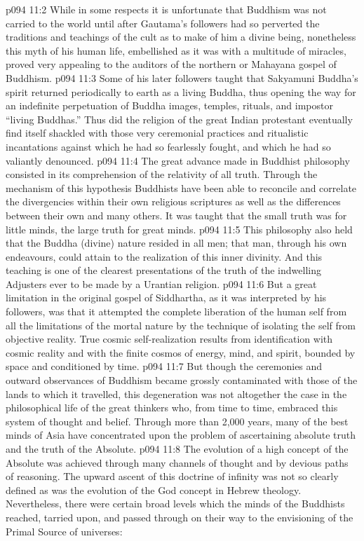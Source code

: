 \vs p094 11:2 \pc While in some respects it is unfortunate that Buddhism was not carried to the world until after Gautama’s followers had so perverted the traditions and teachings of the cult as to make of him a divine being, nonetheless this myth of his human life, embellished as it was with a multitude of miracles, proved very appealing to the auditors of the northern or Mahayana gospel of Buddhism.
\vs p094 11:3 Some of his later followers taught that Sakyamuni Buddha’s spirit returned periodically to earth as a living Buddha, thus opening the way for an indefinite perpetuation of Buddha images, temples, rituals, and impostor “living Buddhas.” Thus did the religion of the great Indian protestant eventually find itself shackled with those very ceremonial practices and ritualistic incantations against which he had so fearlessly fought, and which he had so valiantly denounced.
\vs p094 11:4 \pc The great advance made in Buddhist philosophy consisted in its comprehension of the relativity of all truth. Through the mechanism of this hypothesis Buddhists have been able to reconcile and correlate the divergencies within their own religious scriptures as well as the differences between their own and many others. It was taught that the small truth was for little minds, the large truth for great minds.
\vs p094 11:5 This philosophy also held that the Buddha (divine) nature resided in all men; that man, through his own endeavours, could attain to the realization of this inner divinity. And this teaching is one of the clearest presentations of the truth of the indwelling Adjusters ever to be made by a Urantian religion.
\vs p094 11:6 But a great limitation in the original gospel of Siddhartha, as it was interpreted by his followers, was that it attempted the complete liberation of the human self from all the limitations of the mortal nature by the technique of isolating the self from objective reality. True cosmic self\hyp{}realization results from identification with cosmic reality and with the finite cosmos of energy, mind, and spirit, bounded by space and conditioned by time.
\vs p094 11:7 But though the ceremonies and outward observances of Buddhism became grossly contaminated with those of the lands to which it travelled, this degeneration was not altogether the case in the philosophical life of the great thinkers who, from time to time, embraced this system of thought and belief. Through more than 2,000 years, many of the best minds of Asia have concentrated upon the problem of ascertaining absolute truth and the truth of the Absolute.
\vs p094 11:8 The evolution of a high concept of the Absolute was achieved through many channels of thought and by devious paths of reasoning. The upward ascent of this doctrine of infinity was not so clearly defined as was the evolution of the God concept in Hebrew theology. Nevertheless, there were certain broad levels which the minds of the Buddhists reached, tarried upon, and passed through on their way to the envisioning of the Primal Source of universes:
